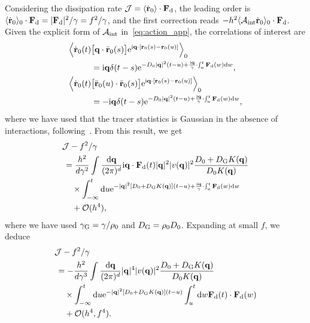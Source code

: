\documentclass[superscriptaddress, twocolumn, prx, longbibliography, nofootinbib]{revtex4-1}
\begin{document}
Considering the dissipation rate ${\cal J}=\langle\dot{\bf r}_0\rangle\cdot{\bf F}_{\rm d}$, the leading order is $\langle\dot{\bf r}_0\rangle_0 \cdot {\bf F}_{\rm d} = |{\bf F}_{\rm d}|^2/\gamma = f^2/\gamma$, and the first correction reads $ - h^2 \langle{\cal A}_{\rm int}\dot{\bf r}_0\rangle_0 \cdot {\bf F}_{\rm d} $. Given the explicit form of ${\cal A}_{\rm int}$ in~\eqref{eq:action_app}, the correlations of interest are
\begin{equation}
	\begin{aligned}
		\Big\langle\dot{\bf r}_0(t) &\big[{\bf q}\cdot\bar{\bf r}_0(s)\big] {\rm e}^{{\rm i}{\bf q}\cdot[{\bf r}_0(s)-{\bf r}_0(u)]}\Big\rangle_0
		\\
		&= {\rm i}{\bf q}\delta(t-s){\rm e}^{ - D_0|{\bf q}|^2(t-u) + \frac{{\rm i}{\bf q}}{\gamma}\cdot\int_u^t {\bf F}_{\rm d}(w) {\rm d}w} ,
		\\
		\Big\langle\dot{\bf r}_0(t) &\big[\bar{\bf r}_0(u)\cdot\bar{\bf r}_0(s)\big] {\rm e}^{{\rm i}{\bf q}\cdot[{\bf r}_0(s)-{\bf r}_0(u)]}\Big\rangle_0
		\\
		&= -{\rm i}{\bf q}\delta(t-s){\rm e}^{ - D_0|{\bf q}|^2(t-u) + \frac{{\rm i}{\bf q}}{\gamma}\cdot\int_u^t {\bf F}_{\rm d}(w) {\rm d}w} ,
	\end{aligned}
\end{equation}
where we have used that the tracer statistics is Gaussian in the absence of interactions, following~\cite{Demery2011, Demery2014}. From this result, we get
\begin{equation}
	\begin{aligned}
		&{\cal J} - f^2/\gamma
		\\
		&\,= \frac{h^2}{d\gamma^2} \int \frac{{\rm d}{\bf q}}{(2\pi)^d} {\rm i}{\bf q}\cdot{\bf F}_{\rm d}(t) |{\bf q}|^2 |v({\bf q})|^2 \frac{D_0+D_{\rm G}K({\bf q})}{D_0K({\bf q})}
		\\
		&\,\quad\times \int_{-\infty}^t {\rm d}u {\rm e}^{-|{\bf q}|^2 [D_0+D_{\rm G} K({\bf q})](t-u) + \frac{{\rm i}{\bf q}}{\gamma}\cdot\int_u^t{\bf F}_{\rm d}(w){\rm d}w}
		\\
		&\,\quad + {\cal O}(h^4) ,
	\end{aligned}
\end{equation}
where we have used $\gamma_{\rm G}=\gamma/\rho_0$ and $D_{\rm G}=\rho_0D_0$. Expanding at small $f$, we deduce
\begin{equation}
	\begin{aligned}
		&{\cal J} - f^2/\gamma
		\\
		&\,= - \frac{h^2}{d\gamma^3} \int \frac{{\rm d}{\bf q}}{(2\pi)^d} |{\bf q}|^4 |v({\bf q})|^2 \frac{D_0+D_{\rm G}K({\bf q})}{D_0K({\bf q})}
		\\
		&\,\quad\times \int_{-\infty}^t {\rm d}u {\rm e}^{-|{\bf q}|^2 [D_0+D_{\rm G} K({\bf q})](t-u)} \int_u^t{\rm d}w{\bf F}_{\rm d}(t)\cdot{\bf F}_{\rm d}(w)
		\\
		&\,\quad + {\cal O}(h^4,f^4) .
	\end{aligned}
\end{equation}
\end{document}
